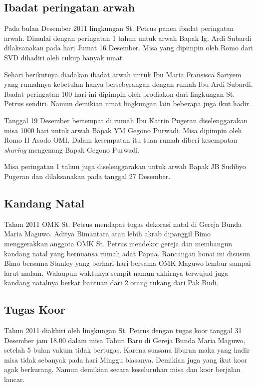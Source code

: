

\subsection*{Ibadat peringatan arwah} Pada bulan Desember 2011 lingkungan St. Petrus panen ibadat peringatan arwah. Dimulai dengan peringatan 1 tahun untuk arwah Bapak Ig. Ardi Subardi dilaksanakan pada hari Jumat 16 Desember. Misa yang dipimpin oleh Romo dari SVD dihadiri oleh cukup banyak umat. 

Sehari berikutnya diadakan ibadat arwah untuk Ibu Maria Fransisca Sariyem yang rumahnya kebetulan hanya berseberangan dengan rumah Ibu Ardi Subardi. Ibadat peringatan 100 hari ini dipimpin oleh prodiakon dari lingkungan St. Petrus sendiri. Namun demikian umat  lingkungan lain beberapa juga ikut hadir.

Tanggal 19 Desember bertempat di rumah Ibu Katrin Pugeran diselenggarakan misa 1000 hari untuk arwah Bapak YM Gegono Purwadi. Misa dipimpin oleh Romo H Asodo OMI. Dalam kesempatan itu tuan rumah diberi kesempatan \textit{sharing} mengenang Bapak Gegono Purwadi.

Misa peringatan 1 tahun juga diselenggarakan untuk arwah Bapak JB Sudibyo Pugeran dan dilaksanakan pada tanggal 27 Desember.

\subsection*{Kandang Natal}
 Tahun 2011 OMK St. Petrus mendapat tugas dekorasi natal di Gereja Bunda Maria Maguwo. Aditya Bimantara atau lebih akrab dipanggil Bimo menggerakkan anggota OMK St. Petrus mendekor gereja dan membangun kandang natal yang bernuansa rumah adat Papua. Rancangan honai ini disusun Bimo bersama Stanley yang berhari-hari bersama OMK Maguwo lembur sampai larut malam. Walaupun waktunya sempit namun akhirnya terwujud juga kandang natalnya berkat bantuan dari 2 orang tukang dari Pak Budi. 

\subsection*{Tugas Koor}
Tahun 2011 diakhiri oleh lingkungan St. Petrus dengan tugas koor tanggal 31 Desember jam 18.00 dalam misa Tahun Baru di Gereja Bunda Maria Maguwo, setelah 5 bulan vakum tidak bertugas. Karena suasana liburan maka yang hadir misa tidak sebanyak pada hari Minggu biasanya. Demikian juga yang ikut koor agak berkurang. Namun demikian secara keseluruhan misa dan koor berjalan lancar.  
